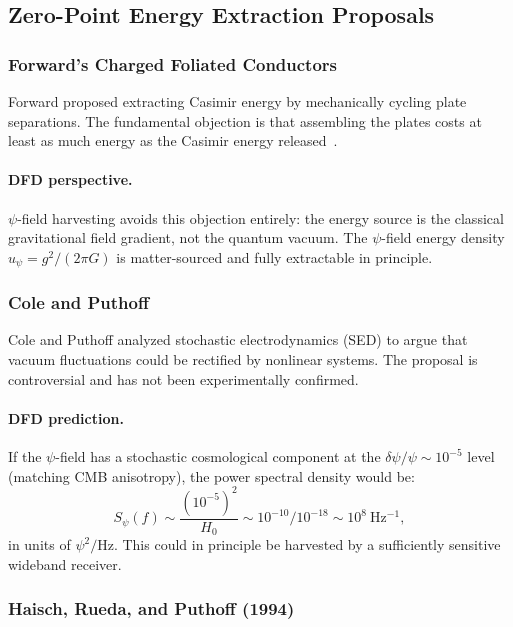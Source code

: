 \documentclass[aps,prd,twocolumn,showpacs,preprintnumbers,superscriptaddress,nofootinbib]{revtex4-2}
\begin{document}
\subsection{Zero-Point Energy Extraction Proposals}\label{sec:zpe}

\subsubsection{Forward's Charged Foliated Conductors~\cite{Forward1984}}

Forward proposed extracting Casimir energy by mechanically cycling
plate separations.  The fundamental objection is that assembling the
plates costs at least as much energy as the Casimir energy
released~\cite{JaffePhysRevD2005}.

\paragraph{DFD perspective.}
$\psi$-field harvesting avoids this objection entirely: the energy
source is the classical gravitational field gradient, not the quantum
vacuum.  The $\psi$-field energy density $u_\psi = g^2/(2\pi G)$ is
matter-sourced and fully extractable in principle.

\subsubsection{Cole and Puthoff~\cite{Cole1993}}

Cole and Puthoff analyzed stochastic electrodynamics (SED) to argue
that vacuum fluctuations could be rectified by nonlinear systems.
The proposal is controversial and has not been experimentally
confirmed.

\paragraph{DFD prediction.}
If the $\psi$-field has a stochastic cosmological component at the
$\delta\psi/\psi \sim 10^{-5}$ level (matching CMB anisotropy), the
power spectral density would be:
\begin{equation}
S_\psi(f) \sim \frac{(10^{-5})^2}{H_0} \sim 10^{-10}/10^{-18}
  \sim 10^{8}~\mathrm{Hz^{-1}},
\end{equation}
in units of $\psi^2/\mathrm{Hz}$.  This could in principle be
harvested by a sufficiently sensitive wideband receiver.

\subsubsection{Haisch, Rueda, and Puthoff (1994)~\cite{HRP1994}}
\end{document}
